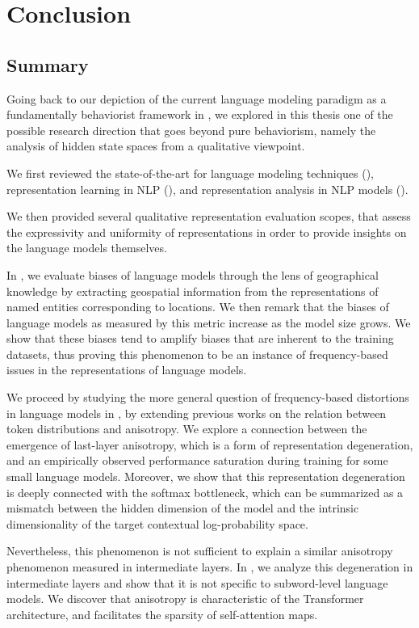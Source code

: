 \chapter{Conclusion}

\section{Summary}
Going back to our depiction of the current language modeling paradigm as a fundamentally behaviorist framework in , we explored in this thesis one of the possible research direction that goes beyond pure behaviorism, namely the analysis of hidden state spaces from a qualitative viewpoint. 

We first reviewed the state-of-the-art for language modeling techniques (), representation learning in NLP (), and representation analysis in NLP models ().

We then provided several qualitative representation evaluation scopes, that assess the expressivity and uniformity of representations in order to provide insights on the language models themselves.

In , we evaluate biases of language models through the lens of geographical knowledge by extracting geospatial information from the representations of named entities corresponding to locations. We then remark that the biases of language models as measured by this metric increase as the model size grows. We show that these biases tend to amplify biases that are inherent to the training datasets, thus proving this phenomenon to be an instance of frequency-based issues in the representations of language models.

We proceed by studying the more general question of frequency-based distortions in language models in , by extending previous works on the relation between token distributions and anisotropy. We explore a connection between the emergence of last-layer anisotropy, which is a form of representation degeneration, and an empirically observed performance saturation during training for some small language models. Moreover, we show that this representation degeneration is deeply connected with the softmax bottleneck, which can be summarized as a mismatch between the hidden dimension of the model and the intrinsic dimensionality of the target contextual log-probability space.

Nevertheless, this phenomenon is not sufficient to explain a similar anisotropy phenomenon measured in intermediate layers. In , we analyze this degeneration in intermediate layers and show that it is not specific to subword-level language models. We discover that anisotropy is characteristic of the Transformer architecture, and facilitates the sparsity of self-attention maps.

